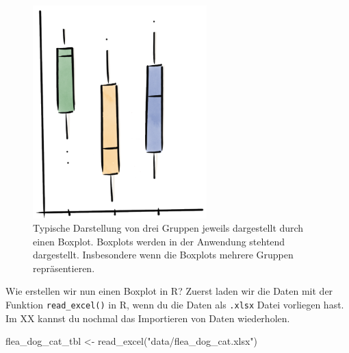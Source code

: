 \documentclass[
  letterpaper,
  DIV=11,
  oneside]{scrreport}
\newenvironment{Shaded}{\begin{snugshade}}{\end{snugshade}}
\newcommand{\FunctionTok}[1]{\textcolor[rgb]{0.28,0.35,0.67}{#1}}
\newcommand{\NormalTok}[1]{\textcolor[rgb]{0.00,0.23,0.31}{#1}}
\newcommand{\OtherTok}[1]{\textcolor[rgb]{0.00,0.23,0.31}{#1}}
\newcommand{\StringTok}[1]{\textcolor[rgb]{0.13,0.47,0.30}{#1}}
\begin{document}
\begin{figure}

{\centering \includegraphics[width=0.6\textwidth,height=\textheight]{./images/boxplot-drawn-flipped.png}

}

\caption{\label{fig-boxplot-drawn-flipped}Typische Darstellung von drei
Gruppen jeweils dargestellt durch einen Boxplot. Boxplots werden in der
Anwendung stehtend dargestellt. Insbesondere wenn die Boxplots mehrere
Gruppen repräsentieren.}

\end{figure}

Wie erstellen wir nun einen Boxplot in R? Zuerst laden wir die Daten mit
der Funktion \texttt{read\_excel()} in R, wenn du die Daten als
\texttt{.xlsx} Datei vorliegen hast. Im XX kannst du nochmal das
Importieren von Daten wiederholen.

\begin{Shaded}
\begin{Highlighting}[]
\NormalTok{flea\_dog\_cat\_tbl }\OtherTok{\textless{}{-}} \FunctionTok{read\_excel}\NormalTok{(}\StringTok{"data/flea\_dog\_cat.xlsx"}\NormalTok{)}
\end{Highlighting}
\end{Shaded}
\end{document}
